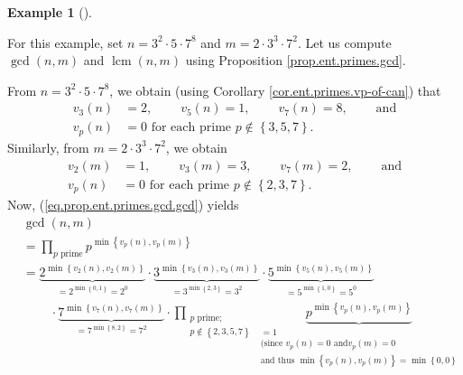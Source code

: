 \documentclass[numbers=enddot,12pt,final,onecolumn,notitlepage]{scrartcl}%
\numberwithin{exer}{subsection}
\theoremstyle{definition}
\newtheorem{exam}[theo]{Example}
\newenvironment{example}[1][]
{\begin{exam}[#1]\begin{leftbar}}
{\end{leftbar}\end{exam}}
\let\prodnonlimits\prod
\renewcommand{\prod}{\prodnonlimits\limits}
\begin{document}
\begin{example}
For this example, set $n=3^{2}\cdot5\cdot7^{8}$ and $m=2\cdot3^{3}\cdot7^{2}$.
Let us compute $\gcd\left(  n,m\right)  $ and $\operatorname{lcm}\left(
n,m\right)  $ using Proposition \ref{prop.ent.primes.gcd}.

From $n=3^{2}\cdot5\cdot7^{8}$, we obtain (using Corollary
\ref{cor.ent.primes.vp-of-can}) that%
\begin{align*}
v_{3}\left(  n\right)   &  =2,\ \ \ \ \ \ \ \ \ \ v_{5}\left(  n\right)
=1,\ \ \ \ \ \ \ \ \ \ v_{7}\left(  n\right)
=8,\ \ \ \ \ \ \ \ \ \ \text{and}\\
v_{p}\left(  n\right)   &  =0\text{ for each prime }p\notin\left\{
3,5,7\right\}  .
\end{align*}
Similarly, from $m=2\cdot3^{3}\cdot7^{2}$, we obtain%
\begin{align*}
v_{2}\left(  m\right)   &  =1,\ \ \ \ \ \ \ \ \ \ v_{3}\left(  m\right)
=3,\ \ \ \ \ \ \ \ \ \ v_{7}\left(  m\right)
=2,\ \ \ \ \ \ \ \ \ \ \text{and}\\
v_{p}\left(  n\right)   &  =0\text{ for each prime }p\notin\left\{
2,3,7\right\}  .
\end{align*}
Now, (\ref{eq.prop.ent.primes.gcd.gcd}) yields%
\begin{align*}
&  \gcd\left(  n,m\right) \\
&  =\prod_{p\text{ prime}}p^{\min\left\{  v_{p}\left(  n\right)  ,v_{p}\left(
m\right)  \right\}  }\\
&  =\underbrace{2^{\min\left\{  v_{2}\left(  n\right)  ,v_{2}\left(  m\right)
\right\}  }}_{=2^{\min\left\{  0,1\right\}  }=2^{0}}\cdot\underbrace{3^{\min
\left\{  v_{3}\left(  n\right)  ,v_{3}\left(  m\right)  \right\}  }}%
_{=3^{\min\left\{  2,3\right\}  }=3^{2}}\cdot\underbrace{5^{\min\left\{
v_{5}\left(  n\right)  ,v_{5}\left(  m\right)  \right\}  }}_{=5^{\min\left\{
1,0\right\}  }=5^{0}}\\
&  \ \ \ \ \ \ \ \ \ \ \cdot\underbrace{7^{\min\left\{  v_{7}\left(  n\right)
,v_{7}\left(  m\right)  \right\}  }}_{=7^{\min\left\{  8,2\right\}  }=7^{2}%
}\cdot\prod_{\substack{p\text{ prime;}\\p\notin\left\{  2,3,5,7\right\}
}}\underbrace{p^{\min\left\{  v_{p}\left(  n\right)  ,v_{p}\left(  m\right)
\right\}  }}_{\substack{=1\\\text{(since }v_{p}\left(  n\right)  =0\text{ and
}v_{p}\left(  m\right)  =0\\\text{and thus }\min\left\{  v_{p}\left(
n\right)  ,v_{p}\left(  m\right)  \right\}  =\min\left\{  0,0\right\}
}}
\end{align*}
\end{example}
\end{document}
